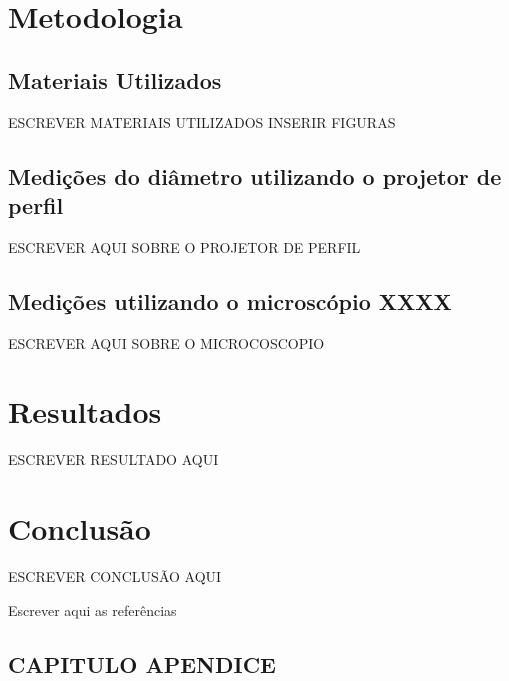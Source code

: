 \documentclass[
	12pt,				%
    oneside,			%
	a4paper,			%
	english,			%
	french,				%
	spanish,			%
	brazil,				%
	]{abntex2}
\begin{document}
\chapter{Metodologia}

\section{Materiais Utilizados}


{%
ESCREVER MATERIAIS UTILIZADOS INSERIR FIGURAS

\section{Medições do diâmetro utilizando o projetor de perfil}
ESCREVER AQUI SOBRE O PROJETOR DE PERFIL
} %

\section{Medições utilizando o microscópio XXXX}
{ESCREVER AQUI SOBRE O MICROCOSCOPIO}

\chapter{Resultados}
{ESCREVER RESULTADO AQUI}

\chapter{Conclusão}
{ESCREVER CONCLUSÃO AQUI }
 
{Escrever aqui as referências}
%
%




\begin{apendicesenv}

\partapendices
\chapter{CAPITULO APENDICE}
\end{apendicesenv}
\end{document}
